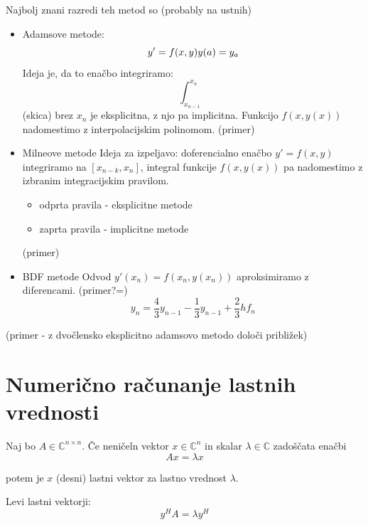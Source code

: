 \documentclass[a4paper,12pt]{article}
\theoremstyle{definition}
\theoremstyle{remark}
\newcommand{\C}{\mathbb{C}}
\begin{document}
Najbolj znani razredi teh metod so (probably na ustnih)
\begin{itemize}
    \item Adamsove metode:
    \begin{equation*}
        y' = f(x, y) \\
        y(a) = y_a
    \end{equation*}
    Ideja je, da to enačbo integriramo:
    \begin{equation*}
        \int_{x_{n-1}}^{x_n} 
    \end{equation*}
    (skica)
    brez $x_n$ je eksplicitna, z njo pa implicitna. Funkcijo $f(x, y(x))$ nadomestimo z interpolacijskim polinomom.
    (primer)
    \item Milneove metode
    Ideja za izpeljavo: doferencialno enačbo $y' = f(x, y)$ integriramo na $[x_{n-k}, x_n]$, integral funkcije $f(x, y(x))$ pa nadomestimo
    z izbranim integracijskim pravilom.
    \begin{itemize}
        \item odprta pravila - eksplicitne metode
        \item zaprta pravila - implicitne metode
    \end{itemize}
    (primer)
    \item BDF metode
    Odvod $y'(x_n) = f(x_n, y(x_n))$ aproksimiramo z diferencami.
    (primer?=)
    \begin{equation*}
        y_n = \frac{4}{3} y_{n-1} - \frac{1}{3} y_{n-1} + \frac{2}{3} h f_n
    \end{equation*}
\end{itemize}

(primer - z dvočlensko eksplicitno adamsovo metodo določi približek)

\section{Numerično računanje lastnih vrednosti}

Naj bo $A \in \C^{n \times n}$. Če neničeln vektor $x \in \C^n$ in skalar $\lambda \in \C$ zadoščata enačbi
\begin{equation*}
    Ax = \lambda x
\end{equation*}

potem je $x$ (desni) lastni vektor za lastno vrednost $\lambda$.

Levi lastni vektorji:
\begin{equation*}
    y^H A = \lambda y^H
\end{equation*}
\end{document}
